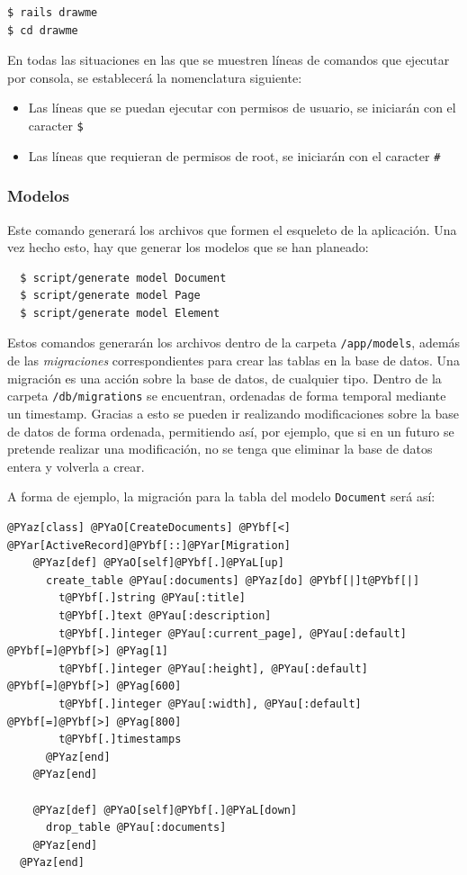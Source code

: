 \begin{verbatim}
$ rails drawme
$ cd drawme
\end{verbatim}

En todas las situaciones en las que se muestren líneas de comandos que ejecutar por consola, se establecerá la nomenclatura siguiente:
\begin{itemize}
  \item Las líneas que se puedan ejecutar con permisos de usuario, se iniciarán con el caracter \texttt{\$}
  \item Las líneas que requieran de permisos de root, se iniciarán con el caracter \texttt{\#}
\end{itemize}

\subsubsection{Modelos} %
\label{ssub:modelos}

Este comando generará los archivos que formen el esqueleto de la aplicación. Una vez hecho esto, hay que generar los modelos que se han planeado:

\begin{verbatim}
  $ script/generate model Document
  $ script/generate model Page
  $ script/generate model Element
\end{verbatim}

Estos comandos generarán los archivos dentro de la carpeta \texttt{/app/models}, además de las \emph{migraciones} correspondientes para crear las tablas en la base de datos. Una migración es una acción sobre la base de datos, de cualquier tipo. Dentro de la carpeta \texttt{/db/migrations} se encuentran, ordenadas de forma temporal mediante un timestamp. Gracias a esto se pueden ir realizando modificaciones sobre la base de datos de forma ordenada, permitiendo así, por ejemplo, que si en un futuro se pretende realizar una modificación, no se tenga que eliminar la base de datos entera y volverla a crear.

A forma de ejemplo, la migración para la tabla del modelo \texttt{Document} será así:

\begin{Verbatim}[commandchars=@\[\]]
  @PYaz[class] @PYaO[CreateDocuments] @PYbf[<] @PYar[ActiveRecord]@PYbf[::]@PYar[Migration]
    @PYaz[def] @PYaO[self]@PYbf[.]@PYaL[up]
      create_table @PYau[:documents] @PYaz[do] @PYbf[|]t@PYbf[|]
        t@PYbf[.]string @PYau[:title]
        t@PYbf[.]text @PYau[:description]
        t@PYbf[.]integer @PYau[:current_page], @PYau[:default] @PYbf[=]@PYbf[>] @PYag[1]
        t@PYbf[.]integer @PYau[:height], @PYau[:default] @PYbf[=]@PYbf[>] @PYag[600]
        t@PYbf[.]integer @PYau[:width], @PYau[:default] @PYbf[=]@PYbf[>] @PYag[800]
        t@PYbf[.]timestamps
      @PYaz[end]
    @PYaz[end]

    @PYaz[def] @PYaO[self]@PYbf[.]@PYaL[down]
      drop_table @PYau[:documents]
    @PYaz[end]
  @PYaz[end]
\end{Verbatim}

